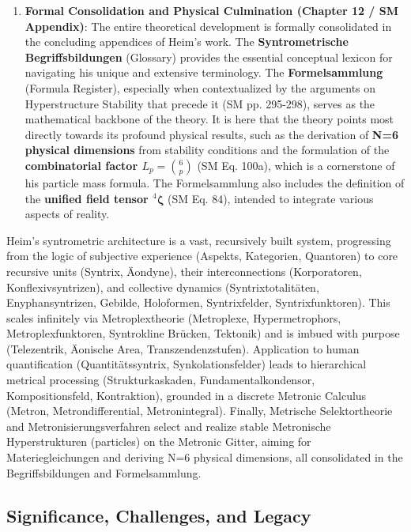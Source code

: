 \documentclass[12pt]{article}
\newcommand{\strukturkompressor}{{}^4\bm{\zeta}}
\begin{document}
\begin{enumerate}
    \item \textbf{Formal Consolidation and Physical Culmination (Chapter 12 / SM Appendix)}: The entire theoretical development is formally consolidated in the concluding appendices of Heim's work. The \textbf{Syntrometrische Begriffsbildungen} (Glossary) provides the essential conceptual lexicon for navigating his unique and extensive terminology. The \textbf{Formelsammlung} (Formula Register), especially when contextualized by the arguments on Hyperstructure Stability that precede it (SM pp. 295-298), serves as the mathematical backbone of the theory. It is here that the theory points most directly towards its profound physical results, such as the derivation of \textbf{N=6 physical dimensions} from stability conditions and the formulation of the \textbf{combinatorial factor \( L_p = \binom{6}{p} \)} (SM Eq. 100a), which is a cornerstone of his particle mass formula. The Formelsammlung also includes the definition of the \textbf{unified field tensor \( \strukturkompressor \)} (SM Eq. 84), intended to integrate various aspects of reality.
\end{enumerate}

Heim's syntrometric architecture is a vast, recursively built system, progressing from the logic of subjective experience (Aspekts, Kategorien, Quantoren) to core recursive units (Syntrix, Äondyne), their interconnections (Korporatoren, Konflexivsyntrizen), and collective dynamics (Syntrixtotalitäten, Enyphansyntrizen, Gebilde, Holoformen, Syntrixfelder, Syntrixfunktoren). This scales infinitely via Metroplextheorie (Metroplexe, Hypermetrophors, Metroplexfunktoren, Syntrokline Brücken, Tektonik) and is imbued with purpose (Telezentrik, Äonische Area, Transzendenzstufen). Application to human quantification (Quantitätssyntrix, Synkolationsfelder) leads to hierarchical metrical processing (Strukturkaskaden, Fundamentalkondensor, Kompositionsfeld, Kontraktion), grounded in a discrete Metronic Calculus (Metron, Metrondifferential, Metronintegral). Finally, Metrische Selektortheorie and Metronisierungsverfahren select and realize stable Metronische Hyperstrukturen (particles) on the Metronic Gitter, aiming for Materiegleichungen and deriving N=6 physical dimensions, all consolidated in the Begriffsbildungen and Formelsammlung.

\subsection{Significance, Challenges, and Legacy}
\label{sec:significance_challenges_legacy}
\end{document}
